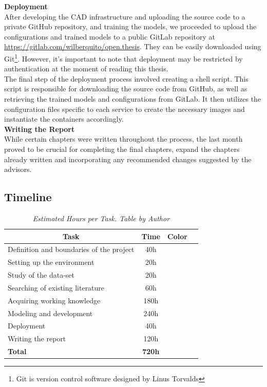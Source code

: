 \vspace{0.5cm}
\textbf{Deployment} \\

After developing the CAD infrastructure and uploading the source code to a private GitHub repository, and training the models,
we proceeded to upload the configurations and trained models to a public
GitLab repository at \url{https://gitlab.com/wilberquito/open.thesis}.
They can be easily downloaded using Git\footnote{Git is version control software designed by Linus Torvalds}.
However, it's important to note that deployment may be restricted by authentication at the moment of reading this thesis. \\

The final step of the deployment process involved creating a shell script.
This script is responsible for downloading the source code from GitHub,
as well as retrieving the trained models and configurations from GitLab.
It then utilizes the configuration files specific to each service to create the necessary
images and instantiate the containers accordingly. \\

\vspace{0.5cm}
\textbf{Writing the Report} \\

While certain chapters were written throughout the process, the last month proved to be crucial for completing the final chapters, expand the chapters already written and incorporating any recommended changes suggested by the advisors.


\subsection{Timeline}

\begin{table}[H]
\centering
\begin{tabular}{| l | c | c | c |}
\hline
\multicolumn{1}{|c|}{\textbf{Task}} & \multicolumn{1}{c|}{\textbf{Time}} & \multicolumn{1}{c|}{\textbf{Color}} \\
\hline
Definition and boundaries of the project & 40h & \cellcolor{red!50} \\
\hline
Setting up the environment & 20h & \cellcolor{lime!50} \\
\hline
Study of the data-set & 20h & \cellcolor{blue!40} \\
\hline
Searching of existing literature & 60h & \cellcolor{teal!50} \\
\hline
Acquiring working knowledge & 180h & \cellcolor{amber!30} \\
\hline
Modeling and development & 240h & \cellcolor{black!70} \\
\hline
Deployment & 40h & \cellcolor{gray!50} \\
\hline
Writing the report & 120h & \cellcolor{orange!50} \\
\hline
\textbf{Total} & \textbf{720h} & \\
\hline
\end{tabular}
\caption[Estimated Hours per Task.]{\textit{Estimated Hours per Task. Table by Author}}
{\label{table:timeline_tasks}}
\end{table}

